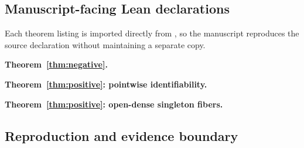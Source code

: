 \documentclass[mlmain]{jmlr}
\begin{document}
\subsection{Manuscript-facing Lean declarations}

Each theorem listing is imported directly from , so the
manuscript reproduces the source declaration without maintaining a separate copy.

\noindent\begin{minipage}{\linewidth}
\textbf{Theorem~\ref{thm:negative}.}\par
\smallskip

\end{minipage}
\par\medskip

\noindent\begin{minipage}{\linewidth}
\textbf{Theorem~\ref{thm:positive}: pointwise identifiability.}\par
\smallskip

\end{minipage}
\par\medskip

\newpage
\noindent\begin{minipage}{\linewidth}
\textbf{Theorem~\ref{thm:positive}: open-dense singleton fibers.}\par
\smallskip

\end{minipage}
\par\medskip

\subsection{Reproduction and evidence boundary}
\end{document}
